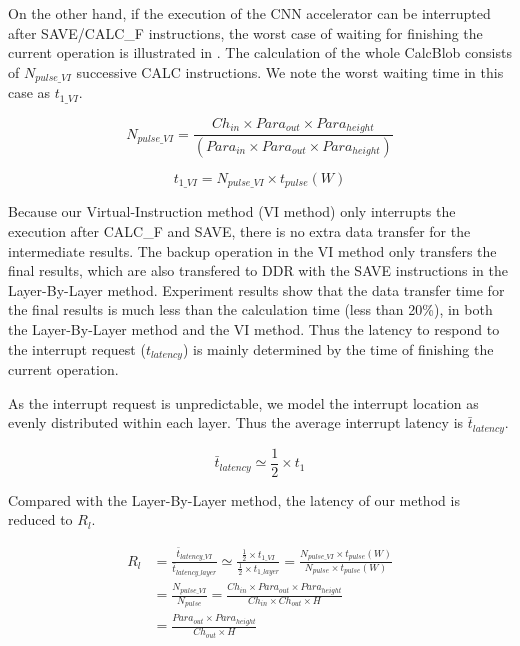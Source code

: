On the other hand, if the execution of the CNN accelerator can be interrupted after SAVE/CALC\_F instructions, the worst case of waiting for finishing the current operation is illustrated in . The calculation of the whole CalcBlob consists of $N_{pulse\_VI}$ successive CALC instructions. We note the worst waiting time in this case as $t_{1\_VI}$.

\begin{equation}
	N_{pulse\_VI} = \frac{ Ch_{in} \times Para_{out} \times Para_{height} }{ (Para_{in} \times Para_{out} \times Para_{height}) } 
\end{equation}

\begin{equation}
t_{1\_VI} = N_{pulse\_VI} \times t_{pulse}(W)
\end{equation}


Because our Virtual-Instruction method (VI method) only interrupts the execution after CALC\_F and SAVE, there is no extra data transfer for the intermediate results. The backup operation in the VI method only transfers the final results, which are also transfered to DDR with the SAVE instructions in the Layer-By-Layer method. Experiment results show that the data transfer time for the final results is much less than the calculation time (less than 20\%), in both the Layer-By-Layer method and the VI method. Thus the latency to respond to the interrupt request ($t_{latency}$) is mainly determined by the time of finishing the current operation.

As the interrupt request is unpredictable, we model the interrupt location as evenly distributed within each layer. Thus the average interrupt latency is $\bar{t}_{latency} $.

\begin{equation}
	\bar{t}_{latency}  \simeq \frac{1}{2} \times t_{1}
\end{equation}

Compared with the Layer-By-Layer method, the latency of our method is reduced to $R_l$.

\begin{equation}
	\begin{split}
	R_l & =  \frac{\bar{t}_{latency\_VI}}{\bar{t}_{latency\_layer}} \simeq \frac{\frac{1}{2} \times t_{1\_VI}}{\frac{1}{2} \times t_{1\_layer}}  = \frac{ N_{pulse\_VI} \times t_{pulse}(W) }{ N_{pulse} \times t_{pulse}(W) }  \\
		   & = \frac{ N_{pulse\_VI} }{N_{pulse} } = \frac{ Ch_{in} \times Para_{out} \times Para_{height}  }{  Ch_{in} \times Ch_{out} \times H } \\
		   & = \frac{ Para_{out} \times Para_{height} }{ Ch_{out} \times H} 
	\end{split}
\end{equation}

